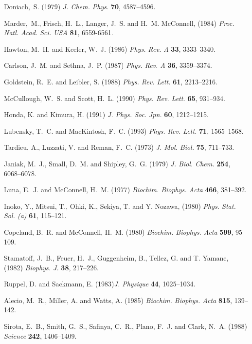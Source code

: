 \begin{thebibliography}{10}

Doniach,~S. (1979) {\it J. Chem. Phys.} {\bf 70},  4587--4596.

Marder,~M., Frisch, H.~L., Langer, J.~S. and H.~M. McConnell, (1984)
{\it  Proc. Natl. Acad.  Sci. USA} {\bf 81},  6559-6561.

Hawton, M.~H. and Keeler, W.~J. (1986) {\it Phys. Rev. A} {\bf 33}, 3333--3340.

Carlson, J.~M. and Sethna, J.~P. (1987) {\it Phys. Rev. A} {\bf 36}, 3359--3374.

Goldstein, R.~E. and Leibler, S. (1988) {\it Phys. Rev. Lett.} {\bf 61},  
2213--2216.

McCullough, W.~S.  and Scott, H.~L. (1990) {\it Phys. Rev. Lett.} {\bf 65},  
931--934.

Honda, K.  and Kimura, H. (1991) {\it J. Phys. Soc. Jpn.} {\bf 60}, 1212--1215.

Lubensky, T.~C. and MacKintosh, F.~C. (1993) {\it Phys. Rev. Lett.} {\bf 71},  
1565--1568.

Tardieu, A.,  Luzzati, V. and Reman, F.~C. (1973) {\it J. Mol. Biol.} {\bf 75},
711--733.

Janiak, M.~J., Small, D.~M. and Shipley, G.~G. (1979) {\it J. Biol. Chem.} 
{\bf 254}, 6068--6078.

Luna, E.~J. and McConnell, H.~M. (1977) {\it Biochim. Biophys. Acta} {\bf 466},
381--392.

Inoko, Y., Mitsui, T., Ohki, K., Sekiya, T. and Y. Nozawa, (1980) {\it Phys. 
Stat. Sol. (a)} {\bf 61},  115--121.

Copeland, B.~R. and McConnell, H.~M. (1980) {\it Biochim. Biophys. Acta}  
{\bf 599},  95--109.

Stamatoff, J.~B., Feuer, H.~J., Guggenheim, B., Tellez, G. and T. Yamane, (1982)
{\it Biophys. J.} {\bf 38},  217--226.

Ruppel, D. and Sackmann, E. (1983){\it J. Physique} {\bf 44},  1025--1034.

Alecio, M.~R., Miller, A. and Watts, A. (1985) {\it Biochim. Biophys. Acta} 
{\bf 815},  139--142.

Sirota, E.~B., Smith, G.~S., Safinya, C.~R., Plano, F.~J.  and  Clark, N.~A. 
(1988) {\it Science} {\bf 242},  1406--1409.


\end{thebibliography}
